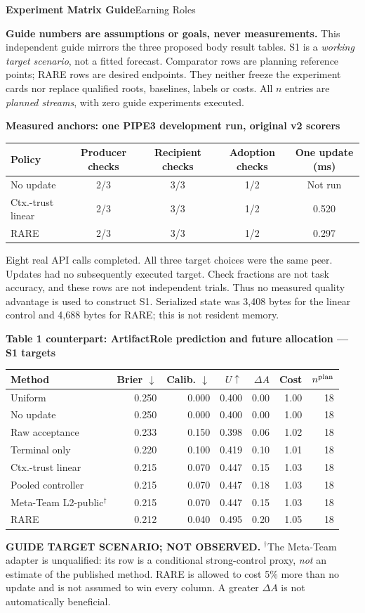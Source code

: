 \documentclass[10pt,a4paper]{article}
\newcommand{\status}{\textcolor{red!70!black}{\textbf{Guide numbers are assumptions or goals, never measurements.}}}
\newcommand{\lead}[1]{\vspace{4pt}\textbf{#1}\par}
\begin{document}
{\Large\bfseries Experiment Matrix Guide}\hfill{\small Earning Roles}
\par\status
This independent guide mirrors the three proposed body result tables. S1 is a
\emph{working target scenario}, not a fitted forecast. Comparator rows are
planning reference points; RARE rows are desired endpoints. They neither freeze
the experiment cards nor replace qualified roots, baselines, labels or costs.
All $n$ entries are \emph{planned streams}, with zero guide experiments executed.

\lead{Measured anchors: one PIPE3 development run, original v2 scorers}
\begin{center}\small
\begin{tabular}{@{}lcccc@{}}\toprule
Policy & Producer checks & Recipient checks & Adoption checks & One update (ms)\\\midrule
No update & 2/3 & 3/3 & 1/2 & Not run\\
Ctx.-trust linear & 2/3 & 3/3 & 1/2 & 0.520\\
RARE & 2/3 & 3/3 & 1/2 & 0.297\\\bottomrule
\end{tabular}\end{center}
Eight real API calls completed. All three target choices were the same peer.
Updates had no subsequently executed target. Check fractions are not task
accuracy, and these rows are not independent trials. Thus no measured quality
advantage is used to construct S1. Serialized state was 3,408 bytes for the
linear control and 4,688 bytes for RARE; this is not resident memory.

\lead{Table 1 counterpart: ArtifactRole prediction and future allocation --- S1 targets}
\begin{center}\small
\begin{tabular}{@{}lrrrrrr@{}}\toprule
Method & Brier $\downarrow$ & Calib. $\downarrow$ & $U\uparrow$ & $\Delta A$ & Cost & $n^{\rm plan}$\\\midrule
Uniform & 0.250 & 0.000 & 0.400 & 0.00 & 1.00 & 18\\
No update & 0.250 & 0.000 & 0.400 & 0.00 & 1.00 & 18\\
Raw acceptance & 0.233 & 0.150 & 0.398 & 0.06 & 1.02 & 18\\
Terminal only & 0.220 & 0.100 & 0.419 & 0.10 & 1.01 & 18\\
Ctx.-trust linear & 0.215 & 0.070 & 0.447 & 0.15 & 1.03 & 18\\
Pooled controller & 0.215 & 0.070 & 0.447 & 0.18 & 1.03 & 18\\
Meta-Team L2-public$^{\dagger}$ & 0.215 & 0.070 & 0.447 & 0.15 & 1.03 & 18\\
RARE & 0.212 & 0.040 & 0.495 & 0.20 & 1.05 & 18\\
\bottomrule\end{tabular}\end{center}
\textbf{GUIDE TARGET SCENARIO; NOT OBSERVED.} $^{\dagger}$The Meta-Team adapter is
unqualified: its row is a conditional strong-control proxy, \emph{not} an
estimate of the published method. RARE is allowed to cost 5\% more than no
update and is not assumed to win every column. A greater $\Delta A$ is not
automatically beneficial.
\end{document}
